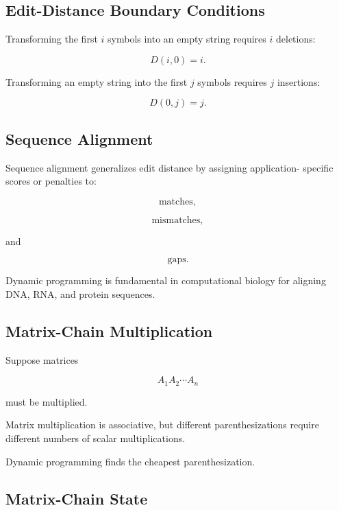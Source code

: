 \subsection{Edit-Distance Boundary Conditions}
\label{subsec:edit-distance-boundary}

Transforming the first \(i\) symbols into an empty string requires \(i\)
deletions:

\[
\boxed{
D(i,0)=i.
}
\]

Transforming an empty string into the first \(j\) symbols requires \(j\)
insertions:

\[
\boxed{
D(0,j)=j.
}
\]

\subsection{Sequence Alignment}
\label{subsec:sequence-alignment-dp}

Sequence alignment generalizes edit distance by assigning application-
specific scores or penalties to:

\[
\boxed{
\text{matches},
}
\]

\[
\boxed{
\text{mismatches},
}
\]

and

\[
\boxed{
\text{gaps}.
}
\]

Dynamic programming is fundamental in computational biology for aligning
DNA, RNA, and protein sequences.

\subsection{Matrix-Chain Multiplication}
\label{subsec:matrix-chain-multiplication}

Suppose matrices

\[
A_1A_2\cdots A_n
\]

must be multiplied.

Matrix multiplication is associative, but different parenthesizations
require different numbers of scalar multiplications.

Dynamic programming finds the cheapest parenthesization.

\subsection{Matrix-Chain State}
\label{subsec:matrix-chain-state}

